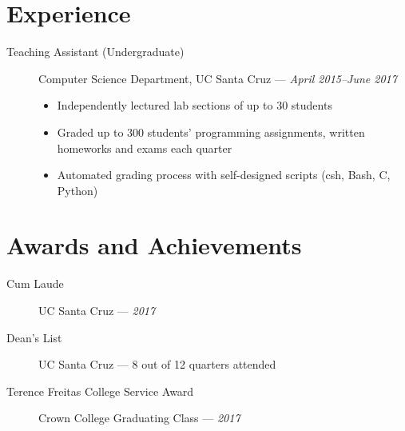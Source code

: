\documentclass[10pt]{article}
\begin{document}
\section*{Experience}
\begin{description}
  \item[Teaching Assistant (Undergraduate)] Computer Science Department, UC Santa Cruz ---
    \textit{April 2015--June 2017}
    \begin{itemize}
      \item Independently lectured lab sections of up to $30$ students
      \item Graded up to $300$ students' programming assignments, written
        homeworks and exams each quarter
      \item Automated grading process with self-designed scripts (csh, Bash, C,
        Python)
    \end{itemize}
\end{description}

\section*{Awards and Achievements}
\begin{description}
  \item[Cum Laude] UC Santa Cruz --- \textit{2017}
  \item[Dean's List] UC Santa Cruz --- 8 out of 12 quarters attended
  \item[Terence Freitas College Service Award] Crown College Graduating Class --- \textit{2017}
\end{description}
\end{document}
